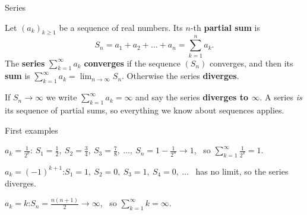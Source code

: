\documentclass{wosm-slides}
\begin{document}
\begin{frame}{Series}
  \begin{definition}
    Let $(a_k)_{k \ge 1}$ be a sequence of real numbers. Its $n$-th \textbf{partial sum} is
    \[ S_n = a_1 + a_2 + \dots + a_n = \sum_{k=1}^{n} a_k . \]
    The \textbf{series} $\sum_{k=1}^{\infty} a_k$ \textbf{converges} if the sequence
    $(S_n)$ converges, and then its \textbf{sum} is
    $\displaystyle\sum_{k=1}^{\infty} a_k = \lim_{n\to\infty} S_n$.
    Otherwise the series \textbf{diverges}.
  \end{definition}
  If $S_n \to \infty$ we write $\sum_{k=1}^\infty a_k = \infty$ and say the series
  \textbf{diverges to $\infty$}.
  A series \emph{is} its sequence of partial sums, so everything we know about sequences applies.
\end{frame}

\begin{frame}{First examples}
  \begin{example}[Halves]
    $a_k = \frac{1}{2^k}$:\quad
    $S_1 = \frac12,\ S_2 = \frac34,\ S_3 = \frac78,\ \dots,\ S_n = 1 - \frac{1}{2^n} \to 1$,
    \ so $\sum_{k=1}^\infty \frac1{2^k} = 1$.
  \end{example}
  \pause
  \begin{example}
    $a_k = (-1)^{k+1}$:\quad $S_1 = 1,\ S_2 = 0,\ S_3 = 1,\ S_4 = 0,\ \dots$ \
    has no limit, so the series diverges.
  \end{example}
  \pause
  \begin{example}
    $a_k = k$:\quad $S_n = \frac{n(n+1)}{2} \to \infty$, \ so $\sum_{k=1}^\infty k = \infty$.
  \end{example}
\end{frame}
\end{document}
